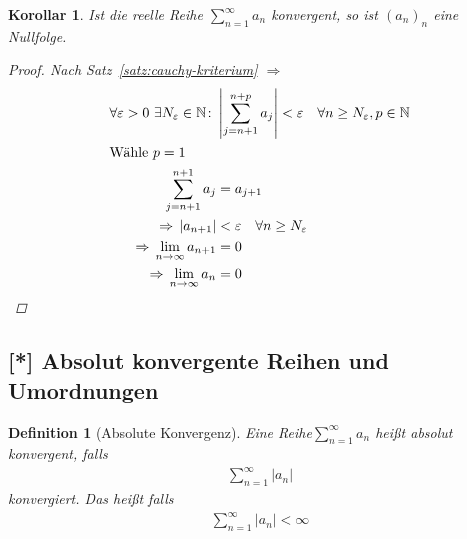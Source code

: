 \documentclass[11pt, twoside, a4paper]{article}
\theoremstyle{plain}
\newtheorem{definition}[blockelement]{Definition}
\newtheorem{korollar}[blockelement]{Korollar}
\newcommand{\abs}[1]{\left\lvert#1\right\rvert}
\newcommand{\impl}[0]{\Rightarrow{}}
\newcommand{\fromto}{\rightarrow{}}
\newcommand{\ntoinf}[0]{n\fromto\infty}
\newcommand{\N}{\mathbb{N}}
\begin{document}
    \begin{korollar} %
        \label{korollar:folge-von-reihe-nullfolge}
        Ist die reelle Reihe $\sum_{n=1}^{\infty} a_n$ konvergent, so ist $(a_n)_n$ eine Nullfolge.
        \begin{proof}
            Nach Satz~\ref{satz:cauchy-kriterium} $\impl$
            \begin{align*}
                \forall \varepsilon > 0~\exists N_{\varepsilon}\in\N\colon &\abs{\sum_{j=n+1}^{n+p} a_j} < \varepsilon\quad\forall n\geq N_{\varepsilon}, p\in\N\\
                \intertext{Wähle $p=1$}
                \sum_{j=n+1}^{n+1} a_{j} &= a_{j+1}\\
                \impl \abs{a_{n+1}} &< \varepsilon\quad \forall n\geq N_{\varepsilon}\\
                \impl \lim_{\ntoinf} a_{n+1} &= 0\\
                \impl \lim_{\ntoinf} a_{n} &= 0\qedhere
            \end{align*}
        \end{proof}
    \end{korollar}

    \subsection{[*] Absolut konvergente Reihen und Umordnungen}

    \begin{definition}[Absolute Konvergenz] %
        Eine Reihe$\sum_{n=1}^{\infty} a_n$ heißt absolut konvergent, falls
        \begin{align*}
            \sum_{n=1}^{\infty} \abs{a_n}
        \end{align*}
        konvergiert. Das heißt falls
        \begin{align*}
            \sum_{n=1}^{\infty} \abs{a_n} < \infty
        \end{align*}
    \end{definition}
\end{document}

